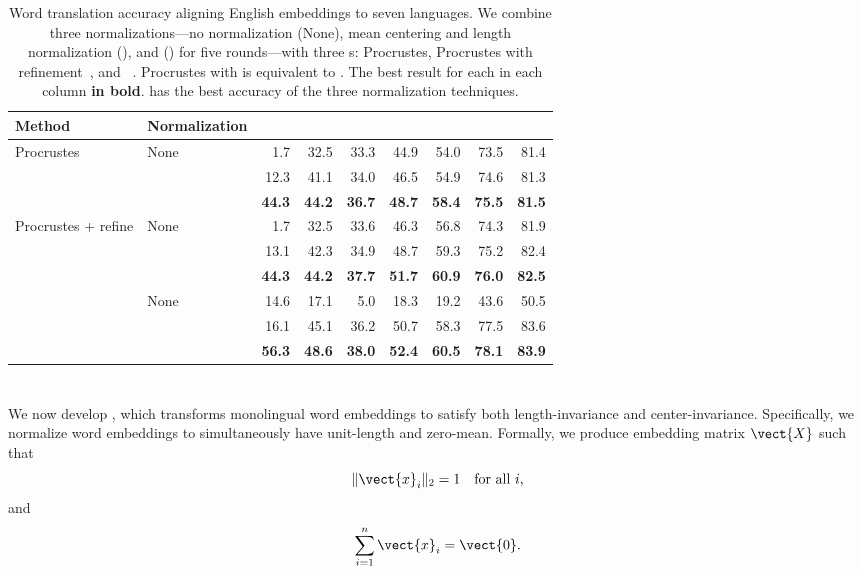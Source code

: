 \begin{table*}
\centering
\begin{tabular}{llRRRRRRR}
\toprule
Method & Normalization & ~ & ~ & ~ & ~ & ~ & ~ & ~\\
\midrule
Procrustes & None & 1.7 & 32.5 & 33.3 & 44.9 & 54.0 & 73.5 & 81.4\\
&  & 12.3 & 41.1 & 34.0 & 46.5 & 54.9 & 74.6 & 81.3\\
&  & \textbf{44.3} & \textbf{44.2} & \textbf{36.7} & \textbf{48.7} & \textbf{58.4} & \textbf{75.5} & \textbf{81.5}\\
\midrule
Procrustes + refine & None & 1.7 & 32.5 & 33.6 & 46.3 & 56.8 & 74.3 & 81.9\\
&  & 13.1 & 42.3 & 34.9 & 48.7 & 59.3 & 75.2 & 82.4\\
&  & \textbf{44.3} & \textbf{44.2} & \textbf{37.7} & \textbf{51.7} & \textbf{60.9} & \textbf{76.0} & \textbf{82.5}\\
\midrule
{} & None & 14.6 & 17.1 & 5.0 & 18.3 & 19.2 & 43.6 & 50.5\\
&  & 16.1 & 45.1 & 36.2 & 50.7 & 58.3 & 77.5 & 83.6\\
&  & \textbf{56.3} & \textbf{48.6} & \textbf{38.0} & \textbf{52.4} & \textbf{60.5} & \textbf{78.1} & \textbf{83.9}\\
\bottomrule
\end{tabular}
\caption{Word translation accuracy aligning English embeddings to seven
  languages. %
  We combine three normalizations---no normalization (None), mean
  centering and length normalization (), and \name{}
  () for five rounds---with three s: Procrustes, Procrustes
  with refinement~\citep{conneau-18}, and
  ~\citep{joulin-18}.
  Procrustes with  is equivalent to \citet{artetxe-16}.
  The best result for each  in each column \textbf{in
  bold}.  \name{} has the best accuracy of the three normalization techniques.}
\label{tab:result}
\end{table*}

\section{\name{}}

We now develop \name{}, which transforms monolingual word embeddings
to satisfy both length-invariance and center-invariance.
%
Specifically, we normalize word embeddings to simultaneously have
unit-length and zero-mean.
%
Formally, we produce embedding matrix $\vect{X}$ such that
\begin{equation}
  \| \vect{x}_i \|_2 = 1 \quad \text{for all $i$}, \label{eq:length-constraint}
\end{equation}
and
\begin{equation}
  \sum_{i=1}^n \vect{x}_i = \vect{0}. \label{eq:center-constraint}
\end{equation}

